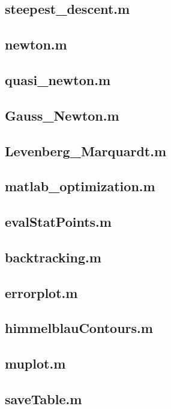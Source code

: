 \subsection{steepest\_descent.m}


\subsection{newton.m}


\subsection{quasi\_newton.m}


\subsection{Gauss\_Newton.m}


\subsection{Levenberg\_Marquardt.m}


\subsection{matlab\_optimization.m}


\subsection{evalStatPoints.m} \label{code:evalStatPoints}


\subsection{backtracking.m}


\subsection{errorplot.m}


\subsection{himmelblauContours.m}


\subsection{muplot.m}


\subsection{saveTable.m}
